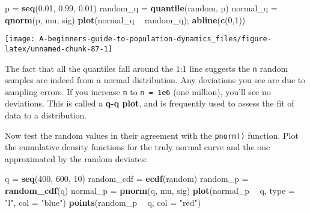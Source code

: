 \documentclass[]{book}
\newenvironment{Shaded}{\begin{snugshade}}{\end{snugshade}}
\newcommand{\DataTypeTok}[1]{\textcolor[rgb]{0.13,0.29,0.53}{#1}}
\newcommand{\DecValTok}[1]{\textcolor[rgb]{0.00,0.00,0.81}{#1}}
\newcommand{\FloatTok}[1]{\textcolor[rgb]{0.00,0.00,0.81}{#1}}
\newcommand{\KeywordTok}[1]{\textcolor[rgb]{0.13,0.29,0.53}{\textbf{#1}}}
\newcommand{\NormalTok}[1]{#1}
\newcommand{\OperatorTok}[1]{\textcolor[rgb]{0.81,0.36,0.00}{\textbf{#1}}}
\newcommand{\StringTok}[1]{\textcolor[rgb]{0.31,0.60,0.02}{#1}}
\begin{document}
\begin{Shaded}
\begin{Highlighting}[]
\NormalTok{p =}\StringTok{ }\KeywordTok{seq}\NormalTok{(}\FloatTok{0.01}\NormalTok{, }\FloatTok{0.99}\NormalTok{, }\FloatTok{0.01}\NormalTok{)}
\NormalTok{random_q =}\StringTok{ }\KeywordTok{quantile}\NormalTok{(random, p)}
\NormalTok{normal_q =}\StringTok{ }\KeywordTok{qnorm}\NormalTok{(p, mu, sig)}
\KeywordTok{plot}\NormalTok{(normal_q }\OperatorTok{~}\StringTok{ }\NormalTok{random_q); }\KeywordTok{abline}\NormalTok{(}\KeywordTok{c}\NormalTok{(}\DecValTok{0}\NormalTok{,}\DecValTok{1}\NormalTok{))}
\end{Highlighting}
\end{Shaded}

\begin{center}\texttt{[image: A-beginners-guide-to-population-dynamics\_files/figure-latex/unnamed-chunk-87-1]} \end{center}

The fact that all the quantiles fall around the 1:1 line suggests the \texttt{n} random samples are indeed from a normal distribution. Any deviations you see are due to sampling errors. If you increase \texttt{n} to \texttt{n\ =\ 1e6} (one million), you'll see no deviations. This is called a \textbf{q-q plot}, and is frequently used to assess the fit of data to a distribution.

Now test the random values in their agreement with the \texttt{pnorm()} function. Plot the cumulative density functions for the truly normal curve and the one approximated by the random deviates:

\begin{Shaded}
\begin{Highlighting}[]
\NormalTok{q =}\StringTok{ }\KeywordTok{seq}\NormalTok{(}\DecValTok{400}\NormalTok{, }\DecValTok{600}\NormalTok{, }\DecValTok{10}\NormalTok{)}
\NormalTok{random_cdf =}\StringTok{ }\KeywordTok{ecdf}\NormalTok{(random)}
\NormalTok{random_p =}\StringTok{ }\KeywordTok{random_cdf}\NormalTok{(q)}
\NormalTok{normal_p =}\StringTok{ }\KeywordTok{pnorm}\NormalTok{(q, mu, sig)}
\KeywordTok{plot}\NormalTok{(normal_p }\OperatorTok{~}\StringTok{ }\NormalTok{q, }\DataTypeTok{type =} \StringTok{"l"}\NormalTok{, }\DataTypeTok{col =} \StringTok{"blue"}\NormalTok{)}
\KeywordTok{points}\NormalTok{(random_p }\OperatorTok{~}\StringTok{ }\NormalTok{q, }\DataTypeTok{col =} \StringTok{"red"}\NormalTok{)}
\end{Highlighting}
\end{Shaded}
\end{document}
